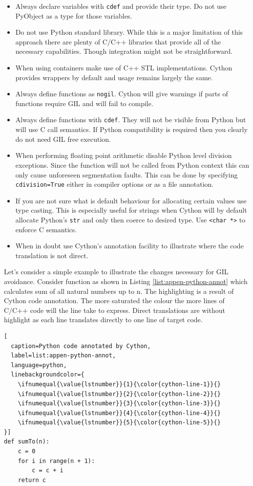 \documentclass[12pt, a4paper]{report}
\begin{document}
\begin{appendices}
\begin{itemize}
  \item Always declare variables with \lstinline{cdef} and provide their type.
    Do not use PyObject as a type for those variables.
  \item Do not use Python standard library. While this is a major limitation
  of this approach there are plenty of C/C++ libraries that provide all of
  the necessary capabilities. Though integration might not be straightforward.
  \item When using containers make use of C++ STL implementations.
    Cython provides wrappers by default and usage remains largely the same.
  \item Always define functions as \lstinline{nogil}. Cython will give warnings
    if parts of functions require GIL and will fail to compile.
  \item Always define functions with \lstinline{cdef}. They will not be visible
    from Python but will use C call semantics. If Python compatibility is required
    then you clearly do not need GIL free execution.
  \item When performing floating point arithmetic disable Python level division
    exceptions. Since the function will not be called from Python context this
    can only cause unforeseen segmentation faults. This can be done by specifying
    \lstinline{cdivision=True} either in compiler options or as a file annotation.
  \item If you are not sure what is default behaviour for allocating certain values
    use type casting. This is especially useful for strings when Cython will
    by default allocate Python's \lstinline{str} and only then coerce to desired
    type. Use \lstinline{<char *>} to enforce C semantics.
  \item When in doubt use Cython's annotation facility to illustrate where the
    code translation is not direct.
\end{itemize}

Let's consider a simple example to illustrate the changes necessary for GIL avoidance.
Consider function as shown in Listing \ref{list:appen-python-annot} which calculates
sum of all natural numbers up to n. The highlighting is a result of Cython code
annotation. The more saturated the colour the more lines of C/C++ code will the
line take to express. Direct translations are without highlight as each line translates
directly to one line of target code.

\begin{lstlisting}[
  caption=Python code annotated by Cython,
  label=list:appen-python-annot,
  language=python,
  linebackgroundcolor={
    \ifnumequal{\value{lstnumber}}{1}{\color{cython-line-1}}{}
    \ifnumequal{\value{lstnumber}}{2}{\color{cython-line-2}}{}
    \ifnumequal{\value{lstnumber}}{3}{\color{cython-line-3}}{}
    \ifnumequal{\value{lstnumber}}{4}{\color{cython-line-4}}{}
    \ifnumequal{\value{lstnumber}}{5}{\color{cython-line-5}}{}
}]
def sumTo(n):
    c = 0
    for i in range(n + 1):
        c = c + i
    return c
\end{lstlisting}


\end{appendices}
\end{document}
